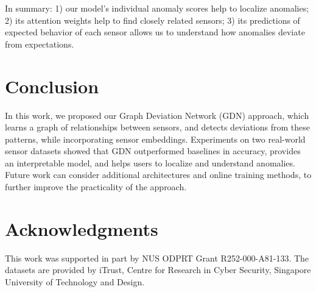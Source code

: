 \documentclass[letterpaper]{article} %
\begin{document}
In summary: 1) our model's individual anomaly scores help to localize anomalies; 2) its attention weights help to find closely related sensors; 3) its predictions of expected behavior of each sensor allows us to understand how anomalies deviate from expectations.



\section{Conclusion}
In this work, we proposed our Graph Deviation Network (\textsc{GDN}) approach, which learns a graph of relationships between sensors, and detects deviations from these patterns, while incorporating sensor embeddings. Experiments on two real-world sensor datasets showed that \textsc{GDN} outperformed baselines in accuracy, provides an interpretable model, and helps users to localize and understand anomalies. Future work can consider additional architectures and online training methods, to further improve the practicality of the approach.

\section*{Acknowledgments}
This work was supported in part by NUS ODPRT Grant R252-000-A81-133. The datasets are provided by iTrust, Centre for Research in Cyber Security, Singapore University of Technology and Design.


 
\end{document}
